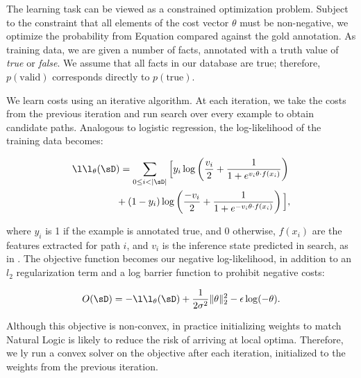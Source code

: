 The learning task can be viewed as a constrained optimization problem.
Subject to the constraint that all elements of the cost vector $\theta$ 
  must be non-negative, we optimize the probability from
  Equation  compared against the gold annotation.
As training data, we are given a number of facts, annotated with a
  truth value of \textit{true} or \textit{false}.
We assume that all facts in our database are true; therefore,
  $p(\textrm{valid})$ corresponds directly to $p(\textrm{true})$.

We learn costs using an iterative algorithm.
At each iteration, we take the costs from the previous iteration
  and run search over every example to obtain candidate paths.
Analogous to logistic regression,
  the log-likelihood of the training data becomes:

\vspace{-0.5em}
\begin{align*}
\l\l_\theta(\sD&) = \sum_{0 \leq i < |\sD|} \Big[
    y_i \log \left(\frac{v_i}{2} + \frac{1}{1 + e^{v_i \theta \cdot f(x_i)}} \right) \\
    &+ (1 - y_i) \log \left(\frac{-v_i}{2} + \frac{1}{1 + e^{-v_i \theta \cdot f(x_i)}} \right)
  \Big],
\end{align*}
\vspace{-0.5em}

\noindent where $y_i$ is 1 if the example is annotated true, and 0
  otherwise, $f(x_i)$ are the features extracted for path $i$, and
  $v_i$ is the inference state predicted in search, as in
  .
The objective function becomes our negative log-likelihood, in addition
  to an $l_2$ regularization term and a log barrier function to 
  prohibit negative costs:
\vspace{-0.5em}

\begin{equation*}
O(\sD) = -\l\l_\theta(\sD) 
  + \frac{1}{2 \sigma^2}\|\theta\|_2^2
  - \epsilon \log(-\theta).
\end{equation*}
\vspace{-0.5em}

Although this objective is non-convex, in practice initializing weights
  to match Natural Logic is likely to reduce the risk of arriving at
  local optima.
Therefore, we \naive ly run a convex solver on the objective after
  each iteration, initialized to the weights from the previous
  iteration.





